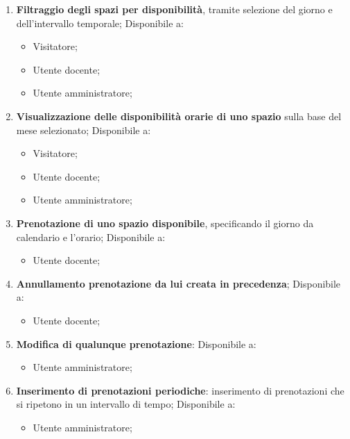 \begin{enumerate}
	\item \textbf{Filtraggio degli spazi per disponibilità}, tramite selezione
	      del giorno e dell'intervallo temporale; Disponibile a:
	      \begin{itemize}
		      \item Visitatore;
		      \item Utente docente;
		      \item Utente amministratore;
	      \end{itemize}

	\item \textbf{Visualizzazione delle disponibilità orarie di uno spazio}
	      sulla base del mese selezionato; Disponibile a:
	      \begin{itemize}
		      \item Visitatore;
		      \item Utente docente;
		      \item Utente amministratore;
	      \end{itemize}

	\item \textbf{Prenotazione di uno spazio disponibile}, specificando il
	      giorno da calendario e l'orario; Disponibile a:
	      \begin{itemize}
		      \item Utente docente;
	      \end{itemize}

	\item \textbf{Annullamento prenotazione da lui creata in precedenza};
	      Disponibile a:
	      \begin{itemize}
		      \item Utente docente;
	      \end{itemize}

	\item \textbf{Modifica di qualunque prenotazione}: Disponibile a:
	      \begin{itemize}
		      \item Utente amministratore;
	      \end{itemize}

	\item \textbf{Inserimento di prenotazioni periodiche}: inserimento di
	      prenotazioni che si ripetono in un intervallo di tempo; Disponibile a:
	      \begin{itemize}
		      \item Utente amministratore;
	      \end{itemize}


\end{enumerate}
